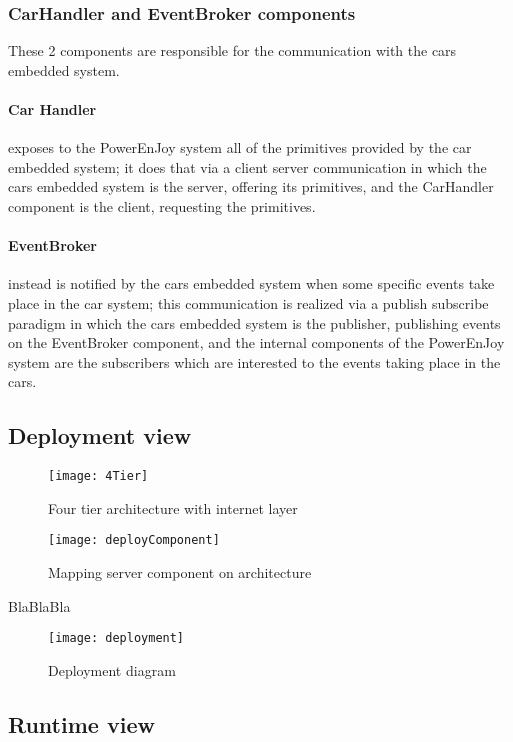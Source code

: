 \subsubsection{CarHandler and EventBroker components}
These 2 components are responsible for the communication with the cars embedded system.
\paragraph{Car Handler} exposes to the PowerEnJoy system all of the primitives provided by the car embedded system; it does that via a client server communication in which the cars embedded system is the server, offering its primitives, and the CarHandler component is the client, requesting the primitives.
\paragraph{EventBroker} instead is notified by the cars embedded system when some specific events take place in the car system; this communication is realized via a publish subscribe paradigm in which the cars embedded system is the publisher, publishing events on the EventBroker component, and the internal components of the PowerEnJoy system are the subscribers which are interested to the events taking place in the cars. 
\clearpage

\subsection{Deployment view}
\label{sec:deploymentView}
\begin{figure}[h!]
	\centering
	\texttt{[image: 4Tier]}
	\caption{
		\label{fig:fourTierCloud} 
		Four tier architecture with internet layer
	}
\end{figure}

\begin{figure}[h]
			\centering
			\texttt{[image: deployComponent]}
			\caption{
				\label{fig:deployServerComponent} 
				Mapping server component on architecture
			}
		\end{figure}
\clearpage

BlaBlaBla
\begin{figure}[h!]
	\centering
	\texttt{[image: deployment]}
	\caption{
		\label{fig:deployment} 
		Deployment diagram
	}
\end{figure}

\clearpage
\subsection{Runtime view}
